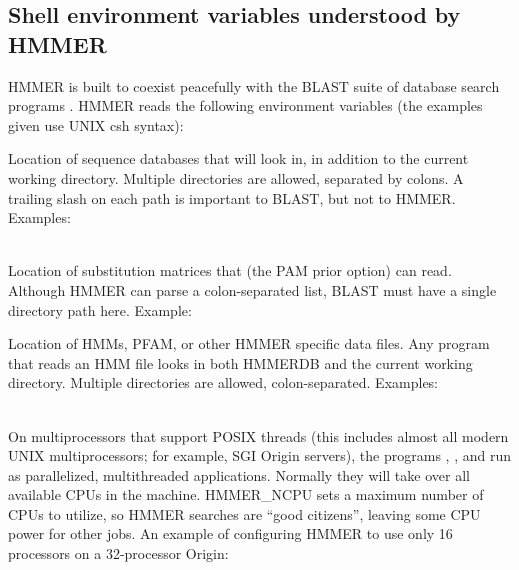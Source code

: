 \subsection{Shell environment variables understood by HMMER}
\label{section:environment}

HMMER is built to coexist peacefully with the BLAST suite of database
search programs \cite{Altschul91,Altschul97}. HMMER reads the
following environment variables (the examples given use UNIX csh
syntax):

\begin{wideitem}
\item [\emprog{BLASTDB}] Location of sequence databases that
	 will look in, in addition to the current
	working directory.
	Multiple directories are allowed, separated by colons. A
	trailing slash on each path is important to BLAST, but not to HMMER.\\
	Examples: \\
	\\

\item [\emprog{BLASTMAT}] Location of substitution matrices that
	 (the PAM prior option) can read.
	Although HMMER can parse a colon-separated list, BLAST must
	have a single directory path here.
	Example:\\

\item [\emprog{HMMERDB}] Location of HMMs, PFAM, or other HMMER
	specific data files. Any program that reads an HMM file
	looks in both HMMERDB and the current working directory.
	Multiple directories are allowed, colon-separated.
	Examples:\\
	\\

\item [\emprog{HMMER\_NCPU}] On multiprocessors that support POSIX
	threads (this includes almost all modern UNIX multiprocessors;
	for example, SGI Origin servers), the programs
	, , and 
	run as parallelized, multithreaded applications.
	Normally they will take over all available CPUs in the machine.
	HMMER\_NCPU sets a maximum number of CPUs to utilize,
	so HMMER searches are ``good citizens'', leaving some
 	CPU power for other jobs. An example of configuring
	HMMER to use only 16 processors on a 32-processor Origin:\\
\end{wideitem}

